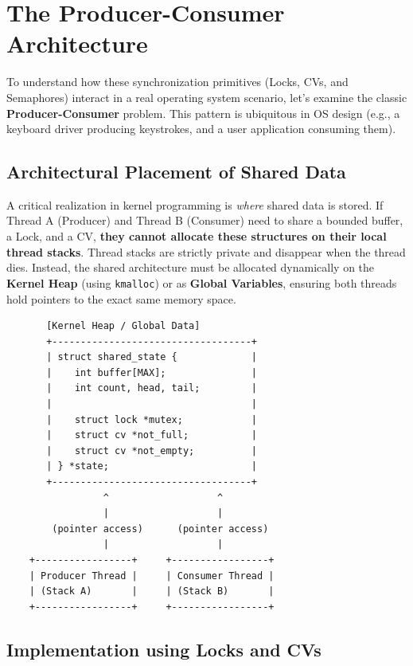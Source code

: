 \section{The Producer-Consumer Architecture}
To understand how these synchronization primitives (Locks, CVs, and Semaphores) interact in a real operating system scenario, let's examine the classic \textbf{Producer-Consumer} problem. This pattern is ubiquitous in OS design (e.g., a keyboard driver producing keystrokes, and a user application consuming them).

\subsection{Architectural Placement of Shared Data}
A critical realization in kernel programming is \textit{where} shared data is stored. 
If Thread A (Producer) and Thread B (Consumer) need to share a bounded buffer, a Lock, and a CV, \textbf{they cannot allocate these structures on their local thread stacks}. Thread stacks are strictly private and disappear when the thread dies.
Instead, the shared architecture must be allocated dynamically on the \textbf{Kernel Heap} (using \texttt{kmalloc}) or as \textbf{Global Variables}, ensuring both threads hold pointers to the exact same memory space.

\begin{verbatim}
       [Kernel Heap / Global Data]
       +-----------------------------------+
       | struct shared_state {             |
       |    int buffer[MAX];               |
       |    int count, head, tail;         |
       |                                   |
       |    struct lock *mutex;            |
       |    struct cv *not_full;           |
       |    struct cv *not_empty;          |
       | } *state;                         |
       +-----------------------------------+
                 ^                   ^
                 |                   |
        (pointer access)      (pointer access)
                 |                   |
    +-----------------+     +-----------------+
    | Producer Thread |     | Consumer Thread |
    | (Stack A)       |     | (Stack B)       |
    +-----------------+     +-----------------+
\end{verbatim}

\subsection{Implementation using Locks and CVs}

